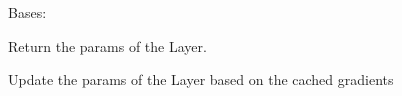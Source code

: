 \documentclass[letterpaper,10pt,english,openany,oneside]{sphinxmanual}
\begin{document}
\begin{fulllineitems}
\label{\detokenize{nn:nn.linear.Layer}}
Bases: {\hyperref[\detokenize{nn:nn.module.Module}]{}}

\begin{fulllineitems}
\label{\detokenize{nn:nn.linear.Layer.param}}
Return the params of the Layer.

\end{fulllineitems}


\begin{fulllineitems}
\label{\detokenize{nn:nn.linear.Layer.update_param}}
Update the params of the Layer based on the cached gradients

\end{fulllineitems}


\end{fulllineitems}

\end{document}
